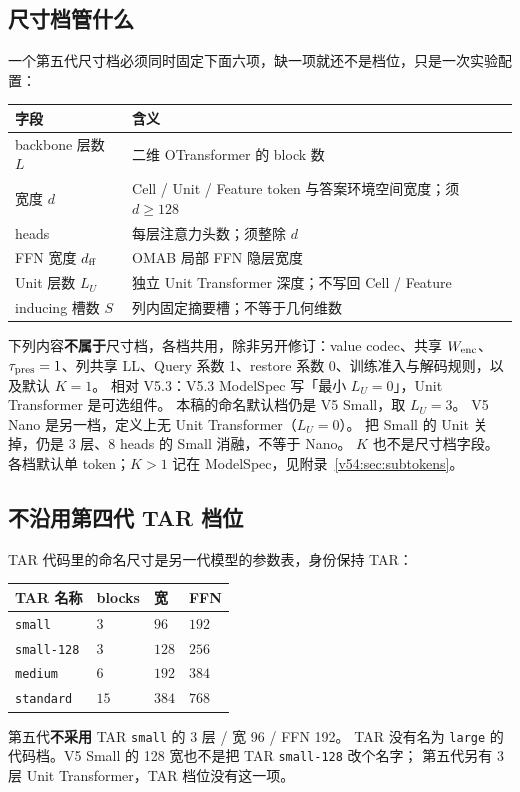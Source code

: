 \documentclass[11pt,UTF8,fontset=fandol]{ctexart}
\numberwithin{equation}{section}
\theoremstyle{definition}
\begin{document}
\subsection{尺寸档管什么}
一个第五代尺寸档必须同时固定下面六项，缺一项就还不是档位，只是一次实验配置：
\begin{center}\small
\begin{tabularx}{\linewidth}{lX}
\toprule
字段 & 含义\\\midrule
backbone 层数 $L$ & 二维 OTransformer 的 block 数\\
宽度 $d$ & Cell / Unit / Feature token 与答案环境空间宽度；须 $d\ge 128$\\
heads & 每层注意力头数；须整除 $d$\\
FFN 宽度 $d_{\rm ff}$ & OMAB 局部 FFN 隐层宽度\\
Unit 层数 $L_U$ & 独立 Unit Transformer 深度；不写回 Cell / Feature\\
inducing 槽数 $S$ & 列内固定摘要槽；不等于几何维数\\\bottomrule
\end{tabularx}
\end{center}
下列内容\textbf{不属于}尺寸档，各档共用，除非另开修订：value codec、共享 $W_{\rm enc}$、
$\tau_{\rm pres}=1$、列共享 LL、Query 系数 1、restore 系数 0、训练准入与解码规则，以及默认 $K=1$。
相对 V5.3：V5.3 ModelSpec 写「最小 $L_U=0$」，Unit Transformer 是可选组件。
本稿的命名默认档仍是 V5 Small，取 $L_U=3$。
V5 Nano 是另一档，定义上无 Unit Transformer（$L_U=0$）。
把 Small 的 Unit 关掉，仍是 3 层、8 heads 的 Small 消融，不等于 Nano。
$K$ 也不是尺寸档字段。各档默认单 token；$K>1$ 记在 ModelSpec，见附录~\ref{v54:sec:subtokens}。

\subsection{不沿用第四代 TAR 档位}
TAR 代码里的命名尺寸是另一代模型的参数表，身份保持 TAR：
\begin{center}\small
\begin{tabularx}{\linewidth}{llll}
\toprule
TAR 名称 & blocks & 宽 & FFN\\\midrule
\texttt{small} & $3$ & $96$ & $192$\\
\texttt{small-128} & $3$ & $128$ & $256$\\
\texttt{medium} & $6$ & $192$ & $384$\\
\texttt{standard} & $15$ & $384$ & $768$\\\bottomrule
\end{tabularx}
\end{center}
第五代\textbf{不采用} TAR \texttt{small} 的 3 层 / 宽 96 / FFN 192。
TAR 没有名为 \texttt{large} 的代码档。V5 Small 的 128 宽也不是把 TAR \texttt{small-128} 改个名字；
第五代另有 3 层 Unit Transformer，TAR 档位没有这一项。
\end{document}
